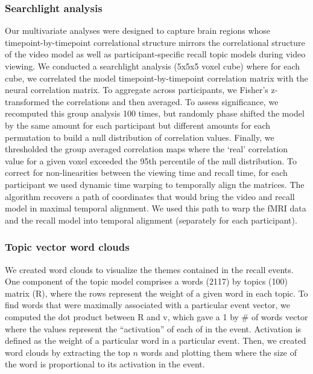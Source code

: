 \documentclass{article}
\begin{document}
\subsubsection*{Searchlight analysis}
Our multivariate analyses were designed to capture brain regions whose timepoint-by-timepoint correlational structure mirrors the correlational structure of the video model as well as participant-specific recall topic models during video viewing. We conducted a searchlight analysis (5x5x5 voxel cube) where for each cube, we correlated the model timepoint-by-timepoint correlation matrix with the neural correlation matrix. To aggregate across participants, we Fisher's z-transformed the correlations and then averaged.  To assess significance, we recomputed this group analysis 100 times, but randomly phase shifted the model by the same amount for each participant but different amounts for each permutation to build a null distribution of correlation values. Finally, we thresholded the group averaged correlation maps where the `real' correlation value for a given voxel exceeded the 95th percentile of the null distribution. To correct for non-linearities between the viewing time and recall time, for each participant we used dynamic time warping to temporally align the matrices. The algorithm recovers a path of coordinates that would bring the video and recall model in maximal temporal alignment. We used this path to warp the fMRI data and the recall model into temporal alignment (separately for each participant).

\subsubsection*{Topic vector word clouds}
We created word clouds to visualize the themes contained in the recall events. One component of the topic model comprises a words (2117) by topics (100) matrix (R), where the rows represent the weight of a given word in each topic.  To find words that were maximally associated with a particular event vector, we computed the dot product between R and v, which gave a 1 by \# of words vector where the values represent the ``activation'' of each of in the event. Activation is defined as the weight of a particular word in a particular event. Then, we created word clouds by extracting the top $n$ words and plotting them where the size of the word is proportional to its activation in the event.
\end{document}
